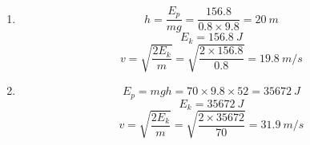 \documentclass[12pt]{article}
\begin{document}
\begin{enumerate}
\item
\[
h = \frac{E_p}{mg} = \frac{156.8}{0.8 \times 9.8} = \SI{20}{m}
\]
\[
E_k = \SI{156.8}{J}
\]
\[
v = \sqrt{\frac{2E_k}{m}} = \sqrt{\frac{2 \times 156.8}{0.8}} = \SI{19.8}{m/s}
\]

\item
\[
E_p = mgh = 70 \times 9.8 \times 52 = \SI{35672}{J}
\]
\[
E_k = \SI{35672}{J}
\]
\[
v = \sqrt{\frac{2E_k}{m}} = \sqrt{\frac{2 \times 35672}{70}} = \SI{31.9}{m/s}
\]

\end{enumerate}
\end{document}

